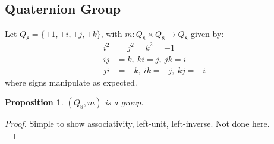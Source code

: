 \documentclass{article}
\newtheorem{theorem}{Proposition}[section]
\theoremstyle{definition}
\theoremstyle{remark}
\begin{document}
\subsection{Quaternion Group}
Let $Q_8=\lbrace \pm 1,\pm i,\pm j,\pm k \rbrace$, with $m:Q_8\times Q_8\rightarrow Q_8$ given by:
\begin{align*}
i^2&=j^2=k^2=-1\\
ij&=k,~ki=j,~jk=i\\
ji&=-k,~ik=-j,~kj=-i
\end{align*}
where signs manipulate as expected.\\

\begin{theorem}
$(Q_8,m)$ is a group.
\end{theorem}
\begin{proof}
Simple to show associativity, left-unit, left-inverse. Not done here.\\
\end{proof}

\newpage
\end{document}
